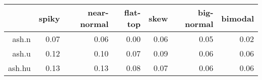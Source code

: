 \begin{tabular}{rrrrrrr}
  \toprule  & spiky & near-normal & flat-top & skew & big-normal & bimodal \\ 
  \midrule ash.n & 0.07 & 0.06 & 0.00 & 0.06 & 0.05 & 0.02 \\ 
  ash.u & 0.12 & 0.10 & 0.07 & 0.09 & 0.06 & 0.06 \\ 
  ash.hu & 0.13 & 0.13 & 0.08 & 0.07 & 0.06 & 0.06 \\ 
   \bottomrule \end{tabular}

